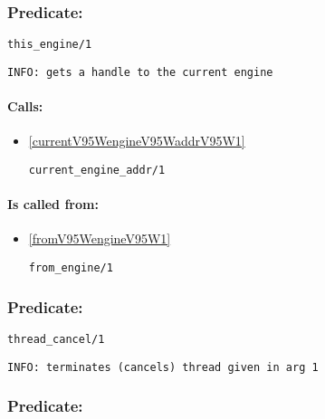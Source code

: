 \subsubsection{Predicate:} \label{thisV95WengineV95W1}

\begin{verbatim}
this_engine/1
\end{verbatim}

{\small \begin{verbatim}
INFO: gets a handle to the current engine

\end{verbatim}}
\paragraph{Calls:} 
\begin{itemize}
\item \ref{currentV95WengineV95WaddrV95W1} 
\begin{verbatim}
current_engine_addr/1
\end{verbatim}

\end{itemize}
\paragraph{Is called from:} 
\begin{itemize}
\item \ref{fromV95WengineV95W1} 
\begin{verbatim}
from_engine/1
\end{verbatim}

\end{itemize}

\subsubsection{Predicate:} \label{threadV95WcancelV95W1}

\begin{verbatim}
thread_cancel/1
\end{verbatim}

{\small \begin{verbatim}
INFO: terminates (cancels) thread given in arg 1

\end{verbatim}}

\subsubsection{Predicate:} \label{threadV95WexitV95W0}

